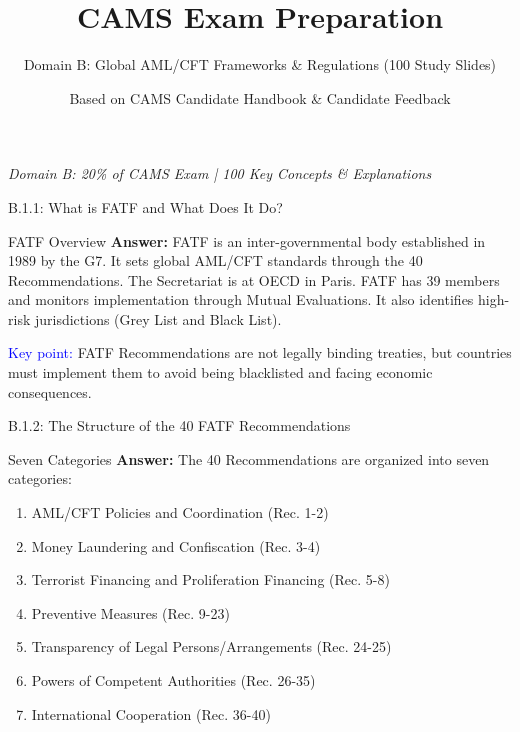 \documentclass{beamer}
\title{CAMS Exam Preparation}
\subtitle{Domain B: Global AML/CFT Frameworks \& Regulations (100 Study Slides)}
\author{Based on CAMS Candidate Handbook \& Candidate Feedback}
\date{}
\begin{document}
	
	\begin{frame}
		\titlepage
		\centering
		\textit{Domain B: 20\% of CAMS Exam | 100 Key Concepts \& Explanations}
	\end{frame}
	
	
	\begin{frame}{B.1.1: What is FATF and What Does It Do?}
		\begin{block}{FATF Overview}
			\textbf{Answer:} FATF is an inter-governmental body established in 1989 by the G7. It sets global AML/CFT standards through the 40 Recommendations. The Secretariat is at OECD in Paris. FATF has 39 members and monitors implementation through Mutual Evaluations. It also identifies high-risk jurisdictions (Grey List and Black List).
		\end{block}
		\textcolor{blue}{Key point:} FATF Recommendations are not legally binding treaties, but countries must implement them to avoid being blacklisted and facing economic consequences.
	\end{frame}
	
	\begin{frame}{B.1.2: The Structure of the 40 FATF Recommendations}
		\begin{block}{Seven Categories}
			\textbf{Answer:} The 40 Recommendations are organized into seven categories:
			\begin{enumerate}
				\item AML/CFT Policies and Coordination (Rec. 1-2)
				\item Money Laundering and Confiscation (Rec. 3-4)
				\item Terrorist Financing and Proliferation Financing (Rec. 5-8)
				\item Preventive Measures (Rec. 9-23)
				\item Transparency of Legal Persons/Arrangements (Rec. 24-25)
				\item Powers of Competent Authorities (Rec. 26-35)
				\item International Cooperation (Rec. 36-40)
			\end{enumerate}
		\end{block}
	\end{frame}
	
\end{document}
